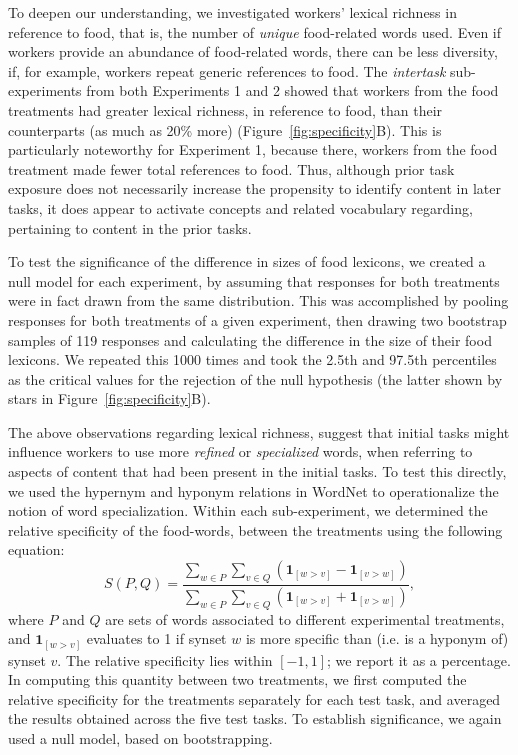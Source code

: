 \documentclass{sigchi}
\begin{document}
To deepen our understanding, we investigated workers' lexical richness in 
reference to food, that is, the number of \textit{unique} food-related 
words used.  Even if workers provide an abundance of food-related words, 
there can be less diversity, if, for example, workers repeat generic 
references to food.
The \textit{intertask} sub-experiments from both Experiments 1 and 2 showed
that workers from the food treatments had
greater lexical richness, in reference to food, than their counterparts 
(as much as 20\% more) (Figure~\ref{fig:specificity}B).  
This is particularly noteworthy for Experiment 1, because there,
workers from the food treatment made fewer total references to food.  
Thus, although prior task exposure does not necessarily increase the 
propensity
to identify content in later tasks, it does appear to activate concepts
and related vocabulary regarding, pertaining to content in the prior tasks.

To test the significance of the difference in sizes of food
lexicons,
we created a null model for each experiment, by assuming that
responses for both treatments were in fact drawn from the same 
distribution.
This was accomplished by pooling responses for both treatments 
of a given experiment, then 
drawing two bootstrap samples of 119 responses and calculating
the difference in the size of their food lexicons.  
We repeated this 1000 times and took the 2.5th and 97.5th percentiles 
as the critical values for the rejection of the null hypothesis 
(the latter shown by stars in Figure~\ref{fig:specificity}B).

The above observations regarding lexical richness, suggest that initial 
tasks might influence workers to use more \textit{refined} or 
\textit{specialized} words, when referring to aspects 
of content that had been present in the initial tasks.  
To test this directly, we used the hypernym and hyponym relations in 
WordNet to operationalize the notion of word specialization.  
Within each sub-experiment, we determined the relative specificity
of the food-words, between the treatments using the following equation:
\begin{equation}
	S(P,Q) = \frac{
		\sum_{w\in P}\sum_{v\in Q} \left(
			\mathbf{1}_{[w>v]} - \mathbf{1}_{[v>w]} \right)
	}{
		\sum_{w\in P}\sum_{v\in Q} \left(
			\mathbf{1}_{[w>v]} + \mathbf{1}_{[v>w]} \right)
	},
\end{equation}
where $P$ and $Q$ are sets of words associated to different experimental 
treatments, and $\mathbf{1}_{[w>v]}$ evaluates
to 1 if synset $w$ is more specific than (i.e. is a hyponym of) synset $v$.
The relative specificity lies within $[-1,1]$; 
we report it as a percentage.
In computing this quantity between two treatments, we first computed the 
relative specificity for the treatments separately for each test task, and 
averaged the results obtained across the five test tasks.  To establish
significance, we again used a null model, based on bootstrapping.
\end{document}

